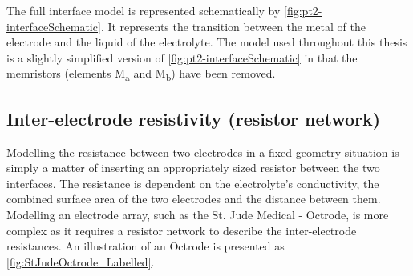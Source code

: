   The full interface model is represented schematically by \cref{fig:pt2-interfaceSchematic}.
  It represents the transition between the metal of the electrode and the liquid of the electrolyte.
  The model used throughout this thesis is a slightly simplified version of \cref{fig:pt2-interfaceSchematic} in that the memristors (elements M\textsubscript{a} and M\textsubscript{b}) have been removed.





  \subsection{Inter-electrode resistivity (resistor network)}


    Modelling the resistance between two electrodes in a fixed geometry situation is simply a matter of inserting an appropriately sized resistor between the two interfaces.
    The resistance is dependent on the electrolyte's conductivity, the combined surface area of the two electrodes and the distance between them.
    Modelling an electrode array, such as the St. Jude Medical - Octrode, is more complex as it requires a resistor network to describe the inter-electrode resistances.
    An illustration of an Octrode is presented as \cref{fig:StJudeOctrode_Labelled}.

